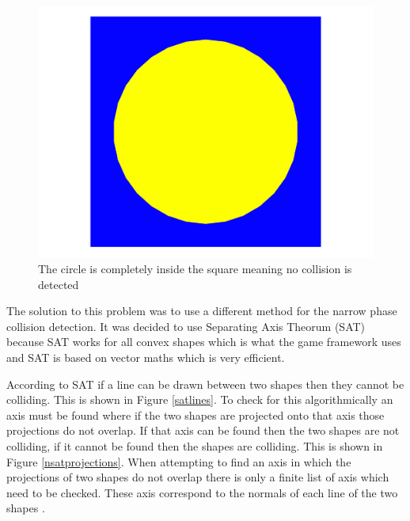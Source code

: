 \documentclass[]{report}
\begin{document}
			\begin{figure}[H]
				\centering
				\includegraphics[scale=0.25]{lineintersectionproblem}
				\caption{The circle is completely inside the square meaning no collision is detected}
				\label{lineintersectionproblem}
			\end{figure}
			
			The solution to this problem was to use a different method for the narrow phase collision detection. It was decided to use Separating Axis Theorum (SAT) \cite{sattutorial} because SAT works for all convex shapes which is what the game framework uses and SAT is based on vector maths which is very efficient. 
			
			According to SAT if a line can be drawn between two shapes then they cannot be colliding. This is shown in Figure \ref{satlines}. To check for this algorithmically an axis must be found where if the two shapes are projected onto that axis those projections do not overlap. If that axis can be found then the two shapes are not colliding, if it cannot be found then the shapes are colliding. This is shown in Figure \ref{nsatprojections}. When attempting to find an axis in which the projections of two shapes do not overlap there is only a finite list of axis which need to be checked. These axis correspond to the normals of each line of the two shapes \cite{sattutorial}.
			
\end{document}
